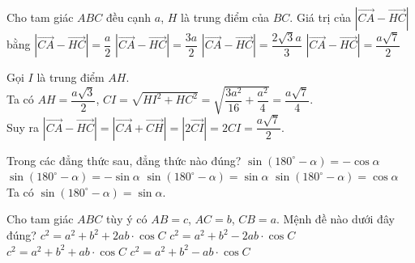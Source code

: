 \begin{ex}%
    Cho tam giác $ABC$ đều cạnh $a$, $H$ là trung điểm của $BC$. Giá trị của $|\overrightarrow{C A}-\overrightarrow{H C}|$ bằng
    \choice
    {$|\overrightarrow{C A}-\overrightarrow{H C}|=\dfrac{a}{2}$}
    {$|\overrightarrow{C A}-\overrightarrow{H C}|=\dfrac{3 a}{2}$}
    {$|\overrightarrow{C A}-\overrightarrow{H C}|=\dfrac{2 \sqrt{3} a}{3}$}
    {\True $|\overrightarrow{C A}-\overrightarrow{H C}|=\dfrac{a \sqrt{7}}{2}$} 
    \loigiai
    {
       \immini
       {
           Gọi $I$ là trung điểm $AH$.\\
           Ta có $AH=\dfrac{a\sqrt{3}}{2}$, $CI=\sqrt{HI^2+HC^2}=\sqrt{\dfrac{3a^2}{16}+\dfrac{a^2}{4}}=\dfrac{a \sqrt{7}}{4}$.\\
           Suy ra  $|\overrightarrow{C A}-\overrightarrow{H C}|=|\overrightarrow{C A}+\overrightarrow{CH}|=|2\overrightarrow{C I}|=2CI=\dfrac{a \sqrt{7}}{2}$.
       }
       {
           
       }
    }
\end{ex}
\begin{ex}%
    Trong các đẳng thức sau, đẳng thức nào đúng?
    \choice
    {$\sin \left(180^{\circ}-\alpha\right)=-\cos \alpha$}
    {$\sin \left(180^{\circ}-\alpha\right)=-\sin \alpha$}
    {\True $\sin \left(180^{\circ}-\alpha\right)=\sin \alpha$}
    {$\sin \left(180^{\circ}-\alpha\right)=\cos \alpha$} 
    \loigiai
    {
        Ta có $\sin \left(180^{\circ}-\alpha\right)=\sin \alpha$.
    }
\end{ex}
\begin{ex}%
    Cho tam giác $ABC$ tùy ý có $AB=c$, $AC=b$, $CB=a$. Mệnh đề nào dưới đây đúng?
    \choice
    {$c^2=a^2+b^2+2ab\cdot\cos C$}
    {\True $c^2=a^2+b^2-2ab\cdot\cos C$}
    {$c^2=a^2+b^2+ab\cdot\cos C$}
    {$c^2=a^2+b^2-ab\cdot\cos C$}
\end{ex}
